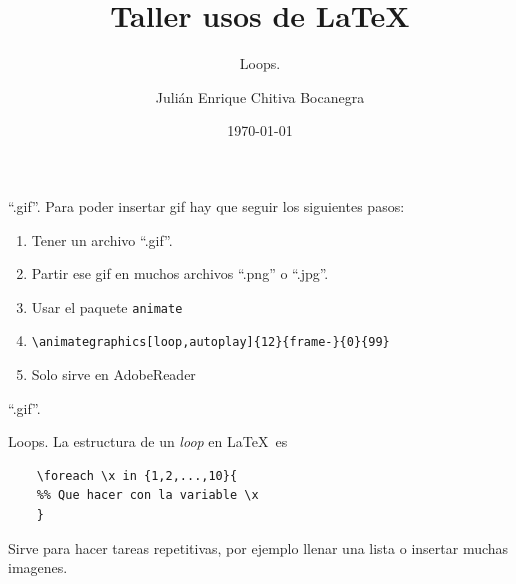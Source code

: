 \documentclass[dvipsnames,xcolor=x11names, handout]{beamer}
\title{Taller usos de \LaTeX}
\subtitle{Loops.}
\author[Julián Chitiva Bocanegra]{Julián Enrique Chitiva Bocanegra}
\institute[Uniandes] 
{Universidad de los Andes\\ Facultad de Economía}
\date{\today}
\theoremstyle{plain}
\theoremstyle{definition}
\begin{document}
\begin{frame}
  \titlepage
\end{frame}

\begin{frame}[fragile]{``.gif''.}
Para poder insertar gif hay que seguir los siguientes pasos:
\begin{enumerate}
    \item Tener un archivo ``.gif''.
    \item Partir ese gif en muchos archivos ``.png'' o ``.jpg''.
    \item Usar el paquete \verb!animate!
    \item \verb!\animategraphics[loop,autoplay]{12}{frame-}{0}{99}!
    \item Solo sirve en AdobeReader
\end{enumerate}
\end{frame}

\begin{frame}{``.gif''.}
\begin{center}
\end{center}
\end{frame}

\begin{frame}[fragile]{Loops.}
La estructura de un \textit{loop} en \LaTeX\ es 
\begin{verbatim}
    \foreach \x in {1,2,...,10}{
    %% Que hacer con la variable \x
    }
\end{verbatim}

Sirve para hacer tareas repetitivas, por ejemplo llenar una lista o insertar muchas imagenes.
\end{frame}
\end{document}

